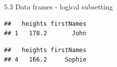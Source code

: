 \documentclass[
  ignorenonframetext,
]{beamer}
\newenvironment{Shaded}{\begin{snugshade}}{\end{snugshade}}
\newcommand{\DecValTok}[1]{\textcolor[rgb]{0.00,0.00,0.81}{#1}}
\newcommand{\NormalTok}[1]{#1}
\newcommand{\SpecialCharTok}[1]{\textcolor[rgb]{0.81,0.36,0.00}{\textbf{#1}}}
\newcommand{\StringTok}[1]{\textcolor[rgb]{0.31,0.60,0.02}{#1}}
\begin{document}
\begin{frame}[fragile]
\begin{block}{5.3 Data frames - logical subsetting}
\protect\hypertarget{data-frames---logical-subsetting}{}
\begin{Shaded}
\end{Shaded}

\begin{verbatim}
##   heights firstNames
## 1   178.2       John
\end{verbatim}

\begin{Shaded}
\end{Shaded}

\begin{verbatim}
##   heights firstNames
## 4   166.2     Sophie
\end{verbatim}
\end{block}
\end{frame}
\end{document}
